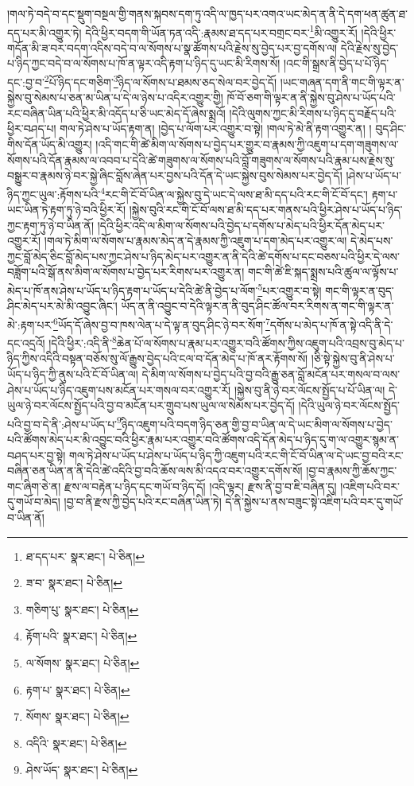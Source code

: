 །གལ་ཏེ་བདེ་བ་དང་སྡུག་བསྔལ་གྱི་གནས་སྐབས་དག་ཏུ་འདི་ལ་ཁྱད་པར་འགའ་ཡང་མེད་ན་ནི་དེ་དག་ཕན་ཚུན་ཐ་དད་པར་མི་འགྱུར་ཏེ། དེའི་ཕྱིར་བདག་གི་ཡོན་ཏན་འདི་:རྣམས་ཐ་དད་པར་བགྲང་བར་\footnote{ཐ་དད་པར་  སྣར་ཐང་།  པེ་ཅིན། }མི་འགྱུར་རོ། །དེའི་ཕྱིར་གདོན་མི་ཟ་བར་བདག་འདིས་བདེ་བ་ལ་སོགས་པ་སྣ་ཚོགས་པའི་རྗེས་སུ་བྱེད་པར་བྱ་དགོས་ལ། དེའི་རྗེས་སུ་བྱེད་པ་ཉིད་ཀྱང་བདེ་བ་ལ་སོགས་པ་ཁོ་ན་ལྟར་འདི་རྟག་པ་ཉིད་དུ་ཡང་མི་རིགས་སོ། །འང་གི་སྒྲས་ནི་བྱེད་པ་པོ་ཉིད་དང་:བྱ་བ་\footnote{ཟ་བ་  སྣར་ཐང་།  པེ་ཅིན། }པོ་ཉིད་དང་གཅིག་\footnote{གཅིག་པུ་  སྣར་ཐང་།  པེ་ཅིན། }ཉིད་ལ་སོགས་པ་ཐམས་ཅད་སེལ་བར་བྱེད་དོ། །ཡང་གཞན་དག་ནི་གང་གི་ལྟར་ན་སྐྱེས་བུ་སེམས་པ་ཅན་མ་ཡིན་པ་དེ་ལ་ཉེས་པ་འདིར་འགྱུར་གྱི། ཁོ་བོ་ཅག་གི་ལྟར་ན་ནི་སྐྱེས་བུ་ཤེས་པ་ཡོད་པའི་རང་བཞིན་ཡིན་པའི་ཕྱིར་མི་འདོད་པ་ཅི་ཡང་མེད་དོ་ཞེས་སྨྲའོ། །དེའི་ལུགས་ཀྱང་མི་རིགས་པ་ཉིད་དུ་བརྗོད་པའི་ཕྱིར་བཤད་པ། གལ་ཏེ་ཤེས་པ་ཡོད་རྟག་ན། །བྱེད་པ་ལོག་པར་འགྱུར་བ་སྟེ། །གལ་ཏེ་མེ་ནི་རྟག་འགྱུར་ན། །
བུད་ཤིང་གིས་དོན་ཡོད་མི་འགྱུར། །འདི་གང་གི་ཚེ་མིག་ལ་སོགས་པ་བྱེད་པར་གྱུར་བ་རྣམས་ཀྱི་འཇུག་པ་དག་གཟུགས་ལ་སོགས་པའི་དོན་རྣམས་ལ་འབབ་པ་དེའི་ཚེ་གཟུགས་ལ་སོགས་པའི་བློ་གཟུགས་ལ་སོགས་པའི་རྣམ་པས་རྗེས་སུ་བསྒྱུར་བ་རྣམས་ཉེ་བར་སྐྱེ་ཞིང་བློས་ཞེན་པར་བྱས་པའི་དོན་དེ་ཡང་སྐྱེས་བུས་སེམས་པར་བྱེད་དོ། །ཤེས་པ་ཡོད་པ་ཉིད་ཀྱང་ཡུལ་:རྟོགས་པའི་\footnote{རྟོག་པའི་  སྣར་ཐང་།  པེ་ཅིན། }རང་གི་ངོ་བོ་ཡིན་ལ་སྐྱེས་བུ་དེ་ཡང་དེ་ལས་ཐ་མི་དད་པའི་རང་གི་ངོ་བོ་དང་། རྟག་པ་ཡང་ཡིན་ཏེ་རྟག་ཏུ་ཉེ་བའི་ཕྱིར་རོ། །སྐྱེས་བུའི་རང་གི་ངོ་བོ་ལས་ཐ་མི་དད་པར་གནས་པའི་ཕྱིར་ཤེས་པ་ཡོད་པ་ཉིད་ཀྱང་རྟག་ཏུ་ཉེ་བ་ཡིན་ནོ། །དེའི་ཕྱིར་འདི་ལ་མིག་ལ་སོགས་པའི་བྱེད་པ་དགོས་པ་མེད་པའི་ཕྱིར་དོན་མེད་པར་འགྱུར་རོ། །གལ་ཏེ་མིག་ལ་སོགས་པ་རྣམས་མེད་ན་དེ་རྣམས་ཀྱི་འཇུག་པ་དག་མེད་པར་འགྱུར་ལ། དེ་མེད་པས་ཀྱང་བློ་མེད་ཅིང་བློ་མེད་པས་ཀྱང་ཤེས་པ་ཉིད་མེད་པར་འགྱུར་ན་ནི་དེའི་ཚེ་དགོས་པ་དང་བཅས་པའི་ཕྱིར་དེ་ལས་བཟློག་པའི་སྒོ་ནས་མིག་ལ་སོགས་པ་བྱེད་པར་རིགས་པར་འགྱུར་ན། གང་གི་ཚེ་ཇི་སྐད་སྨྲས་པའི་ཚུལ་ལ་ལྟོས་པ་མེད་པ་ཁོ་ནས་ཤེས་པ་ཡོད་པ་ཉིད་རྟག་པ་ཡོད་པ་དེའི་ཚེ་ནི་བྱེད་པ་ལོག་\footnote{ལ་སོགས་  སྣར་ཐང་།  པེ་ཅིན། }པར་འགྱུར་བ་སྟེ། གང་གི་ལྟར་ན་བུད་ཤིང་མེད་པར་མེ་མི་འབྱུང་ཞིང་། ཡོད་ན་ནི་འབྱུང་བ་དེའི་ལྟར་ན་ནི་བུད་ཤིང་ཚོལ་བར་རིགས་ན་གང་གི་ལྟར་ན་མེ་:རྟག་པར་\footnote{རྟག་པ་  སྣར་ཐང་།  པེ་ཅིན། }ཡོད་དོ་ཞེས་བྱ་བ་ཁས་ལེན་པ་དེ་ལྟ་ན་བུད་ཤིང་ཉེ་བར་སོག་\footnote{སོགས་  སྣར་ཐང་།  པེ་ཅིན། }དགོས་པ་མེད་པ་ཁོ་ན་སྟེ་འདི་ནི་དེ་དང་འདྲའོ། །དེའི་ཕྱིར་:འདི་ནི་\footnote{འདིའི་  སྣར་ཐང་།  པེ་ཅིན། }ཆེན་པོ་ལ་སོགས་པ་རྣམ་པར་འགྱུར་བའི་ཚོགས་ཀྱིས་འཇུག་པའི་འབྲས་བུ་མེད་པ་ཉིད་ཀྱིས་འདིའི་བསྟན་བཅོས་སུ་ལོ་རྒྱུས་བྱེད་པའི་ངལ་བ་དོན་མེད་པ་ཁོ་ནར་རྟོགས་སོ། །ཅི་སྟེ་སྐྱེས་བུ་ནི་ཤེས་པ་ཡོད་པ་ཉིད་ཀྱི་ནུས་པའི་ངོ་བོ་ཡིན་ལ། དེ་མིག་ལ་སོགས་པ་བྱེད་པའི་བྱ་བའི་རྒྱུ་ཅན་བློ་མངོན་པར་གསལ་བ་ལས་ཤེས་པ་ཡོད་པ་ཉིད་འཇུག་པས་མངོན་པར་གསལ་བར་འགྱུར་རོ། །སྐྱེས་བུ་ནི་ཉེ་བར་ལོངས་སྤྱོད་པ་པོ་ཡིན་ལ། དེ་ཡུལ་ཉེ་བར་ལོངས་སྤྱོད་པའི་བྱ་བ་མངོན་པར་གྲུབ་པས་ཡུལ་ལ་སེམས་པར་བྱེད་དོ། །དེའི་ཡུལ་ཉེ་བར་ལོངས་སྤྱོད་པའི་བྱ་བ་དེ་ནི་:ཤེས་པ་ཡོད་པ་\footnote{ཤེས་ཡོད་  སྣར་ཐང་།  པེ་ཅིན། }ཉིད་འཇུག་པའི་བདག་ཉིད་ཅན་གྱི་བྱ་བ་ཡིན་ལ་དེ་ཡང་མིག་ལ་སོགས་པ་བྱེད་པའི་ཚོགས་མེད་པར་མི་འབྱུང་བའི་ཕྱིར་རྣམ་པར་འགྱུར་བའི་ཚོགས་འདི་དོན་མེད་པ་ཉིད་དུ་ག་ལ་འགྱུར་སྙམ་ན་བཤད་པར་བྱ་སྟེ། གལ་ཏེ་ཤེས་པ་ཡོད་པ་ཤེས་པ་ཡོད་པ་ཉིད་ཀྱི་འཇུག་པའི་རང་གི་ངོ་བོ་ཡིན་ལ་དེ་ཡང་བྱ་བའི་རང་བཞིན་ཅན་ཡིན་ན་ནི་དེའི་ཚེ་འདིའི་བྱ་བའི་ཆོས་ལས་མི་འདའ་བར་འགྱུར་དགོས་སོ། །བྱ་བ་རྣམས་ཀྱི་ཆོས་ཀྱང་གང་ཞིག་ཅེ་ན། རྫས་ལ་བརྟེན་པ་ཉིད་དང་གཡོ་བ་ཉིད་དོ། །འདི་ལྟར། རྫས་ནི་བྱ་བ་ཇི་བཞིན་དུ། །འཇིག་པའི་བར་དུ་གཡོ་བ་མེད། །བྱ་བ་ནི་རྫས་ཀྱི་བྱེད་པའི་རང་བཞིན་ཡིན་ཏེ། དེ་ནི་སྐྱེས་པ་ནས་བཟུང་སྟེ་འཇིག་པའི་བར་དུ་གཡོ་བ་ཡིན་ནོ། 